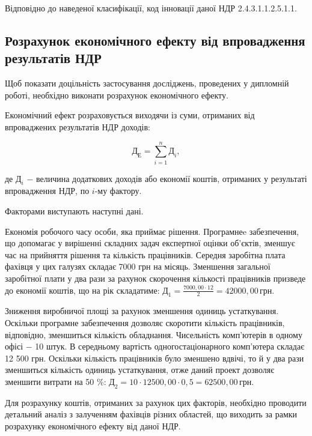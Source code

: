 Відповідно до наведеної класифікації, код інновації даної НДР 2.4.3.1.1.2.5.1.1.

\subsection{Розрахунок економічного ефекту від впровадження результатів НДР}

Щоб показати доцільність застосування досліджень, проведених у дипломній роботі, необхідно виконати розрахунок економічного ефекту.

Економічний ефект розраховується виходячи із суми, отриманих від впроваджених результатів НДР доходів: 

\begin{equation}\label{eq:economy11}
	\text{Д}_{\text{Е}} = \sum_{i=1}^{n}\text{Д}_{i},
\end{equation}

\noindent де $\text{Д}_{i}$ $-$ величина додаткових доходів або економії коштів, отриманих у\newline
\hspace*{15pt}результаті впровадження НДР, по $i$-му фактору. 

\vspace{1.5em}

Факторами виступають наступні дані.

Економія робочого часу особи, яка приймає рішення. Програмнеe забезпечення, що допомагає у вирішенні складних задач експертної оцінки об’єктів, зменшує час на прийняття рішення та кількість працівників. Середня заробітна плата фахівця у цих галузях складає 7000 грн на місяць. Зменшення загальної заробітної плати у два рази за рахунок скорочення кількості працівників призведе до економії коштів, що на рік складатиме: $\text{Д}_{1} = \frac{7000,00 \cdot 12}{2} = 42000,00 \, \text{грн}$.

Зниження виробничої площі за рахунок зменшення одиниць устаткування. Оскільки програмне забезпечення дозволяє скоротити кількість працівників, відповідно, зменшиться кількість обладнання. Чисельність комп’ютерів в одному офісі $-$ 10 штук. В середньому вартість одногостаціонарного комп’ютера складає 12 500 грн. Оскільки кількість працівників було зменшено вдвічі, то й у два рази зменшиться кількість одиниць устаткування, отже даний проект дозволяє зменшити витрати на 50 \%: $\text{Д}_{2} = 10 \cdot 12500,00 \cdot 0,5 = 62500,00 \, \text{грн}$.

Для розрахунку коштів, отриманих за рахунок цих факторів, необхідно проводити детальний аналіз з залученням фахівців різних областей, що виходить за рамки розрахунку економічного ефекту від даної НДР.

